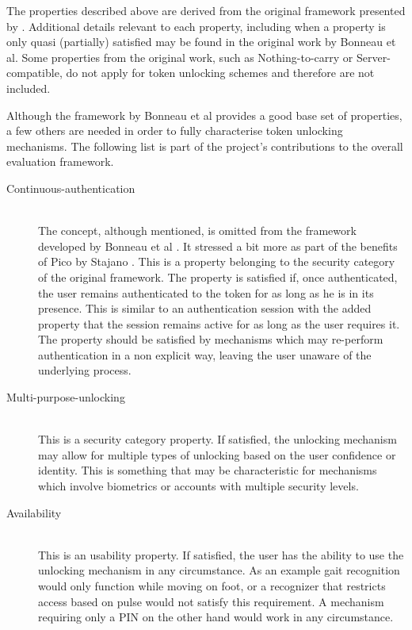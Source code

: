 The properties described above are derived from the original framework presented by \cite{bonneau2012quest}. Additional details relevant to each property, including when a property is only quasi (partially) satisfied may be found in the original work by Bonneau et al. Some properties from the original work, such as Nothing-to-carry or Server-compatible, do not apply for token unlocking schemes and therefore are not included.

Although the framework by Bonneau et al provides a good base set of properties, a few others are needed in order to fully characterise token unlocking mechanisms. The following list is part of the project's contributions to the overall evaluation framework.

\begin{description}
  \item[Continuous-authentication] \hfill \\
  The concept, although mentioned, is omitted from the framework developed by Bonneau et al \cite{bonneau2012quest}. It stressed a bit more as part of the benefits of Pico by Stajano \cite{stajano2011pico}. This is a property belonging to the security category of the original framework. The property is satisfied if, once authenticated, the user remains authenticated to the token for as long as he is in its presence. This is similar to an authentication session with the added property that the session remains active for as long as the user requires it. The property should be satisfied by mechanisms which may re-perform authentication in a non explicit way, leaving the user unaware of the underlying process.
  
  \item[Multi-purpose-unlocking] \hfill \\
  This is a security category property. If satisfied, the unlocking mechanism may allow for multiple types of unlocking based on the user confidence or identity. This is something that may be characteristic for mechanisms which involve biometrics or accounts with multiple security levels.
  
  \item[Availability] \hfill \\
  This is an usability property. If satisfied, the user has the ability to use the unlocking mechanism in any circumstance. As an example gait recognition would only function while moving on foot, or a recognizer that restricts access based on pulse would not satisfy this requirement. A mechanism requiring only a PIN on the other hand would work in any circumstance.
  
\end{description}

